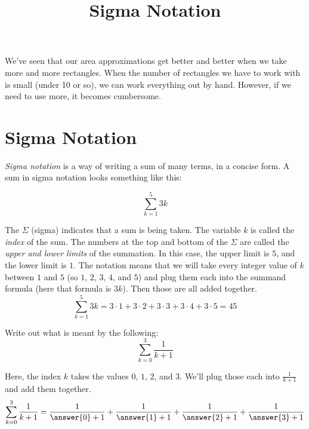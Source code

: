 \documentclass{ximera}
\title[Dig-In:]{Sigma Notation}
\begin{document}
\begin{abstract}

\end{abstract}
\maketitle

We've seen that our area approximations get better and better when we take more 
and more rectangles.  When the number of rectangles we have to work with is small 
(under 10 or so), we can work everything out by hand.  However, if we need to use
more, it becomes cumbersome. 

\section{Sigma Notation}
\emph{Sigma notation} is a way of writing a sum of many terms, in a concise form.  A sum in sigma notation looks something like this:

\[ \sum_{k=1}^{5} 3k \]

The $\Sigma$ (sigma) indicates that a sum is being taken.  The variable $k$ is called the \emph{index} of the sum.  The numbers at the top and bottom of the $\Sigma$
are called the \emph{upper and lower limits} of the summation.  In this case, the upper limit is $5$, and the lower limit is $1$.  The notation means that we will take
every integer value of $k$ between $1$ and $5$ (so $1$, $2$, $3$, $4$, and $5$) and plug them each into the summand formula (here that formula is $3k$).
Then those are all added together.
\[ \sum_{k=1}^{5} 3k= 3\cdot 1 + 3\cdot 2 + 3\cdot 3 + 3\cdot 4 + 3\cdot 5 = 45 \]



\begin{example}
	Write out what is meant by the following:
	\[ \sum_{k=0}^{3} \frac{1}{k+1}\]
	\begin{explanation}
		Here, the index $k$ takes the values $0$, $1$, $2$, and $3$.  We'll plug those each into $\frac{1}{k+1}$ and add them together.
		\[\sum_{k=0}^3 \frac{1}{k+1} = \frac{1}{\answer{0}+1} + \frac{1}{\answer{1}+1} + \frac{1}{\answer{2}+1} + \frac{1}{\answer{3}+1} \]
	\end{explanation}
\end{example}


 
\end{document}
